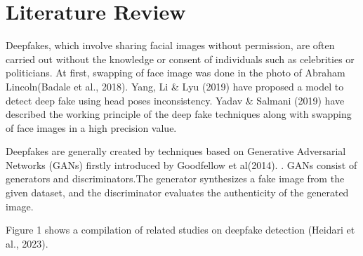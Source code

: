 \chapter{Literature Review}
Deepfakes, which involve sharing facial images without permission, are often carried out without the knowledge or consent of individuals such as celebrities or politicians. At first, swapping of face image was done in the photo of Abraham Lincoln(Badale et al., 2018)\cite{badale2018deep}. Yang, Li \& Lyu (2019)\cite{yang2019exposing} have proposed a model to detect deep fake using head poses inconsistency. Yadav \& Salmani (2019)\cite{yadav2019deepfake} have described the working principle of the deep fake techniques along with swapping of face images in a high precision value.

Deepfakes are generally created by techniques based on
Generative Adversarial Networks (GANs) firstly introduced
by Goodfellow et al(2014). \cite{goodfellow2014generative}. GANs consist of generators and discriminators.The generator synthesizes a fake image from the given dataset, and the discriminator evaluates the authenticity of the generated image.

 
 Figure 1 shows a compilation of related studies on deepfake detection (Heidari et al., 2023)\cite{heidari2023deepfake}.

